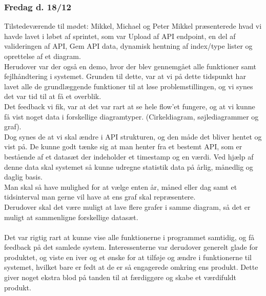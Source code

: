 \subsubsection{Fredag d. 18/12}
Tilstedeværende til mødet: Mikkel, Michael og Peter
Mikkel præsenterede hvad vi havde lavet i løbet af sprintet, som var Upload af API endpoint, en del af valideringen af API, Gem API data, dynamisk hentning af index/type lister og oprettelse af et diagram.\\
Herudover var der også en demo, hvor der blev gennemgået alle funktioner samt fejlhåndtering i systemet. Grunden til dette, var at vi på dette tidspunkt har lavet alle de grundlæggende funktioner til at løse
problemstillingen, og vi synes det var tid til at få et overblik.\\
Det feedback vi fik, var at det var rart at se hele flow'et fungere, og at vi kunne få vist noget data i forskellige diagramtyper. (Cirkeldiagram, søjlediagrammer og graf).\\
Dog synes de at vi skal ændre i API strukturen, og den måde det bliver hentet og vist på.
De kunne godt tænke sig at man henter fra et bestemt API, som er bestående af et datasæt der indeholder et timestamp og en værdi. Ved hjælp af denne data skal systemet så kunne
udregne statistik data på årlig, månedlig og daglig basis.\\
Man skal så have mulighed for at vælge enten år, måned eller dag samt et tidsinterval man gerne vil have at ens graf skal repræsentere.\\
Derudover skal det være muligt at lave flere grafer i samme diagram, så det er muligt at sammenligne forskellige datasæt.\\\\
Det var rigtig rart at kunne vise alle funktionerne i programmet samtidig, og få feedback på det samlede system. Interessenterne var derudover generelt glade for produktet, og viste en iver og et
ønske for at tilføje og ændre i funktionerne til systemet, hvilket bare er fedt at de er så engagerede omkring ens produkt. Dette giver noget ekstra blod på tanden til at færdiggøre og skabe et værdifuldt
produkt.
